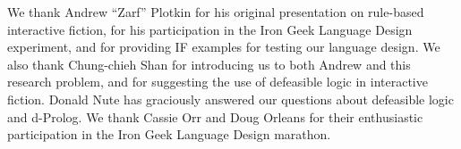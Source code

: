 We thank Andrew ``Zarf'' Plotkin for his original presentation on
rule-based interactive fiction, for his participation in the Iron Geek
Language Design experiment, and for providing IF examples for testing
our language design.
%
We also thank Chung-chieh Shan for introducing us to both Andrew and
this research problem, and for suggesting the use of defeasible logic
in interactive fiction.
%
Donald Nute has graciously answered our questions about defeasible
logic and d-Prolog.
% 
We thank Cassie Orr and Doug Orleans for their enthusiastic
participation in the Iron Geek Language Design marathon.
